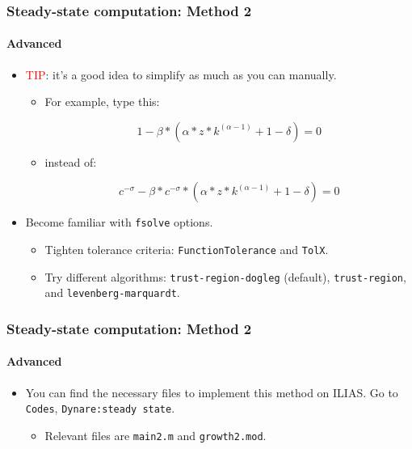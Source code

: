 \documentclass{beamer}
\begin{document}
\begin{frame}[fragile]
\frametitle{Steady-state computation: Method 2}
\framesubtitle{Advanced}
\small 

\begin{itemize}
	\item \textcolor{red}{TIP}: it's a good idea to simplify as much as you can manually.
	\begin{itemize}
		\item For example, type this:
		
		\begin{equation*}
		1-\beta*(\alpha*z*k^{(\alpha-1)} + 1 -\delta) = 0
		\end{equation*}
		
		\item instead of:
		
		\begin{equation*}
		c^{-\sigma}-\beta*c^{-\sigma}*(\alpha*z*k^{(\alpha-1)} + 1 -\delta) = 0
		\end{equation*}
	\end{itemize}
	\pause 
	\item Become familiar with \texttt{fsolve} options.
	\begin{itemize}
		\item Tighten tolerance criteria: \texttt{FunctionTolerance} and \texttt{TolX}.
		\item Try different algorithms: \texttt{trust-region-dogleg} (default), \texttt{trust-region}, and \texttt{levenberg-marquardt}.
	\end{itemize}
	
\end{itemize}

\end{frame}

\begin{frame}[fragile]
\frametitle{Steady-state computation: Method 2}
\framesubtitle{Advanced}
\small 
\begin{itemize}
	\item You can find the necessary files to implement this method on ILIAS. Go to \texttt{Codes}, \texttt{Dynare:steady state}.
	\begin{itemize}
		\item Relevant files are \texttt{main2.m} and \texttt{growth2.mod}.
	\end{itemize}
\end{itemize}
\end{frame}
\end{document}
